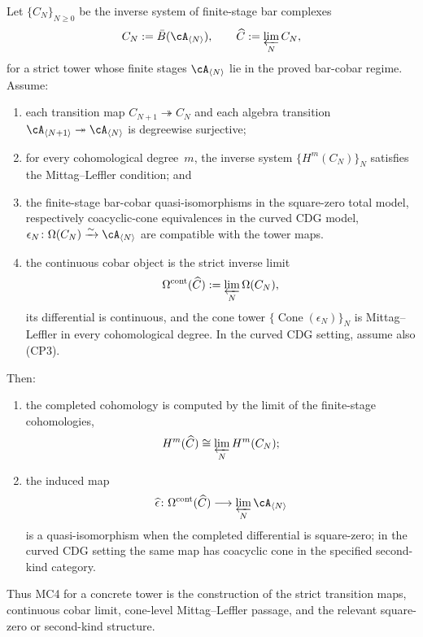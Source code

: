 \begin{proposition}
\label{prop:mc4-reduction-principle}
Let $\{C_N\}_{N \ge 0}$ be the inverse system of finite-stage bar
complexes
\[
C_N := \bar B(\cA_{\langle N\rangle}),
\qquad
\widehat{C} := \varprojlim_N C_N,
\]
for a strict tower whose finite stages
\(\cA_{\langle N\rangle}\) lie in the proved
bar-cobar regime. Assume:
\begin{enumerate}
\item each transition map \(C_{N+1}\twoheadrightarrow C_N\) and each
 algebra transition
 \(\cA_{\langle N+1\rangle}\twoheadrightarrow
 \cA_{\langle N\rangle}\) is degreewise surjective;
\item for every cohomological degree~$m$, the inverse system
 $\{H^m(C_N)\}_N$ satisfies the Mittag--Leffler condition; and
\item the finite-stage bar-cobar quasi-isomorphisms in the
 square-zero total model, respectively coacyclic-cone equivalences in
 the curved CDG model,
 $\epsilon_N \colon \Omega(C_N) \xrightarrow{\sim}
 \cA_{\langle N\rangle}$ are
 compatible with the tower maps.
\item the continuous cobar object is the strict inverse limit
 \[
  \Omega^{\mathrm{cont}}(\widehat C)
  :=\varprojlim_N\Omega(C_N),
 \]
 its differential is continuous, and the cone tower
 \(\{\operatorname{Cone}(\epsilon_N)\}_N\) is Mittag--Leffler in every
 cohomological degree.  In the curved CDG setting, assume also
 \textup{(CP3)}.
\end{enumerate}
Then:
\begin{enumerate}
\item the completed cohomology is computed by the limit of the
 finite-stage cohomologies,
 \[
 H^m(\widehat{C}) \cong \varprojlim_N H^m(C_N);
 \]
\item the induced map
 \[
 \widehat{\epsilon}\colon
 \Omega^{\mathrm{cont}}(\widehat{C}) \longrightarrow
 \varprojlim_N \cA_{\langle N\rangle}
 \]
is a quasi-isomorphism when the completed differential is square-zero;
in the curved CDG setting the same map has coacyclic cone in the
specified second-kind category.
\end{enumerate}
Thus MC4 for a concrete tower is the construction of the strict
transition maps, continuous cobar limit, cone-level
Mittag--Leffler passage, and the relevant square-zero or second-kind
structure.
\end{proposition}

